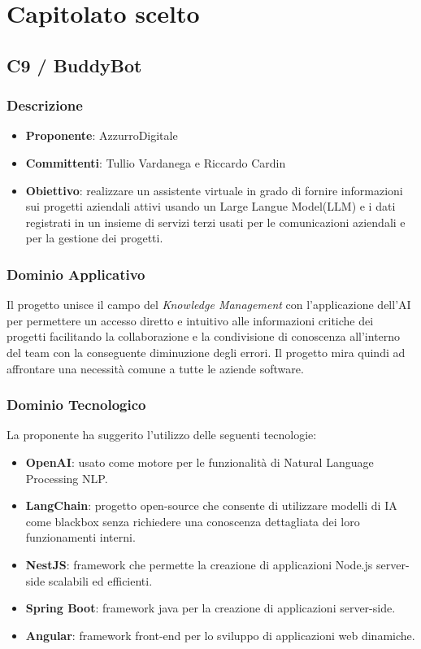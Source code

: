\documentclass[a4paper, 12pt]{article}
\begin{document}
\section{Capitolato scelto}

\subsection{C9 / BuddyBot}

\subsubsection{Descrizione}
\begin{itemize}
    \item \textbf{Proponente}: AzzurroDigitale
    \item \textbf{Committenti}: Tullio Vardanega e Riccardo Cardin
    \item \textbf{Obiettivo}: realizzare un assistente virtuale in grado di fornire informazioni sui progetti aziendali attivi usando un Large Langue Model(LLM) e i dati registrati in un insieme di servizi terzi usati per le comunicazioni aziendali e per la gestione dei progetti.
\end{itemize}

\subsubsection{Dominio Applicativo}
Il progetto unisce il campo del \textit{Knowledge Management} con l’applicazione dell’AI per permettere un accesso diretto e intuitivo alle informazioni critiche dei progetti facilitando la collaborazione e la condivisione di conoscenza all’interno del team con la conseguente diminuzione degli errori.
Il progetto mira quindi ad affrontare una necessità comune a tutte le aziende software.

\subsubsection{Dominio Tecnologico}
La proponente ha suggerito l’utilizzo delle seguenti tecnologie:
\begin{itemize}
    \item \textbf{OpenAI}: usato come motore per le funzionalità di Natural Language Processing NLP.
    \item \textbf{LangChain}: progetto open-source che consente di utilizzare modelli di IA come blackbox senza richiedere una conoscenza dettagliata dei loro funzionamenti interni.
    \item \textbf{NestJS}: framework che permette la creazione di applicazioni Node.js server-side scalabili ed efficienti.
    \item \textbf{Spring Boot}: framework java per la creazione di applicazioni server-side.
    \item \textbf{Angular}: framework front-end per lo sviluppo di applicazioni web dinamiche.
    
\end{itemize}
\end{document}

